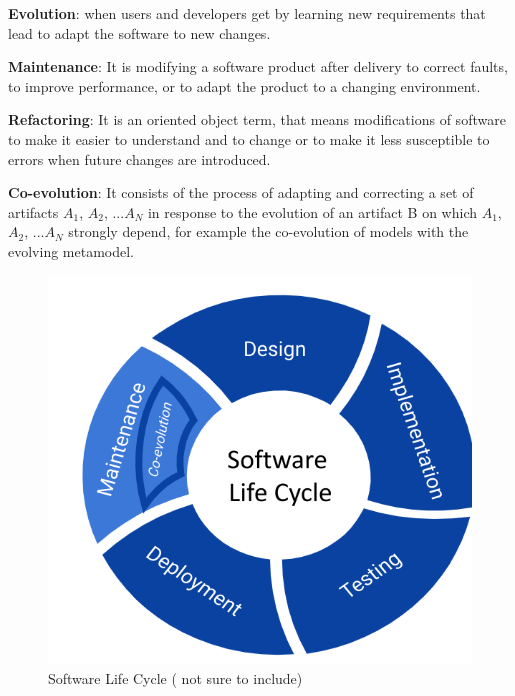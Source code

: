 \textbf{Evolution}: when users and developers get by learning  new requirements that lead to adapt the software to new changes. 

\textbf{Maintenance}: It is modifying a software product after delivery to correct faults, to improve performance, or to adapt the product to a changing environment.

\textbf{Refactoring}: It is an oriented object term, that means modifications of software to make it easier to understand and to change or to make it less susceptible to errors when future changes are introduced. 

\textbf{Co-evolution}: It consists of the process of adapting and correcting a set of artifacts $A_1$, $A_2$, ...$A_N$ in response to the evolution of an artifact B on which $A_1$, $A_2$, ...$A_N$  strongly depend, for example the co-evolution of models with the evolving metamodel.


\begin{figure}[htbp]
	\begin{center}
		\includegraphics[width=0.6\linewidth]{./pics/soaPics/solicy.png}
	\end{center}
	\caption{Software Life Cycle ( not sure to include)}
	\label{fig:softwarelifecyle}
\end{figure}

